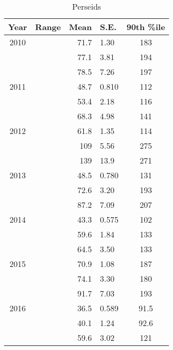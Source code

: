 \documentclass[a4paper,12pt,twocolumn]{report}
\begin{document}
\begin{appendices}
\begin{table*}
	\centering
	\begin{tabular}{|c|c|r@{ \,$\pm$\, }l|c|}
		\hline 
		Year & Range & Mean & S.E. & 90th \%ile\\ 
		\hline 
		2010 & & 71.7 & 1.30 & 183   \\ 
		\hline 
		& &	77.1 & 3.81 & 194   \\ 
		\hline 
		& & 78.5 & 7.26 & 197   \\ 
		\hline 
		2011 & & 48.7 & 0.810 & 112   \\ 
		\hline 
		& & 53.4 & 2.18 & 116   \\ 
		\hline 
		& & 68.3 & 4.98 & 141   \\ 
		\hline 
		2012 & & 61.8 & 1.35 & 114   \\ 
		\hline 
		& & 109 & 5.56 & 275   \\ 
		\hline 
		& & 139 & 13.9 & 271   \\ 
		\hline 
		2013 & & 48.5 & 0.780 & 131   \\ 
		\hline 
		& & 72.6 & 3.20 & 193   \\ 
		\hline 
		& & 87.2 & 7.09 & 207   \\ 
		\hline 
		2014 & & 43.3 & 0.575 & 102   \\ 
		\hline 
		& & 59.6 & 1.84 & 133   \\ 
		\hline 
		& & 64.5 & 3.50 & 133  \\ 
		\hline 
		2015 & & 70.9 & 1.08 & 187   \\ 
		\hline 
		& & 74.1 & 3.30 & 180   \\ 
		\hline 
		& & 91.7 & 7.03 & 193   \\ 
		\hline
		2016 & & 36.5 & 0.589 & 91.5	\\
		\hline 
		& & 40.1 & 1.24 & 92.6   \\ 
		\hline 
		& & 59.6 & 3.02 & 121   \\ 
		\hline 
	\end{tabular}
	\caption{Perseids} 
\end{table*}


\end{appendices}
\end{document}
